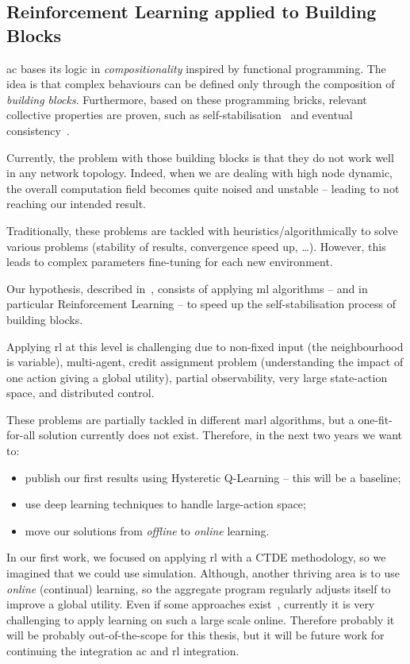 \documentclass[11pt]{article}
\begin{document}
\subsection{Reinforcement Learning applied to Building Blocks}\label{rl-future}
\ac{ac} bases its logic in \textit{compositionality} inspired by functional programming. The idea is that complex behaviours can be defined only through the composition of \emph{building blocks}. Furthermore, based on these programming bricks, relevant collective properties are proven, such as self-stabilisation~\cite{DBLP:journals/corr/abs-1711-08297} and eventual consistency~\cite{DBLP:conf/saso/BealVPD16}. 

Currently, the problem with those building blocks is that they do not work well in any network topology. Indeed, when we are dealing with high node dynamic, the overall computation field becomes quite noised and unstable -- leading to not reaching our intended result.

Traditionally, these problems are tackled with heuristics/algorithmically to solve various problems (stability of results, convergence speed up, \dots{}). However, this leads to complex parameters fine-tuning for each new environment.

Our hypothesis, described in~\cite{research}, consists of applying \ac{ml} algorithms -- and in particular Reinforcement Learning --
to speed up the self-stabilisation process of building blocks.

Applying \ac{rl} at this level is challenging due to non-fixed input (the neighbourhood is variable), multi-agent, credit assignment problem (understanding the impact of one action giving a global utility), partial observability, very large state-action space, and distributed control.

These problems are partially tackled in different \ac{marl} algorithms, but a one-fit-for-all solution currently does not exist. Therefore, in the next two years we want to:
\begin{itemize}
	\item publish our first results using Hysteretic Q-Learning -- this will be a baseline;
	\item use deep learning techniques to handle large-action space;
	\item move our solutions from \emph{offline} to \emph{online} learning. 
\end{itemize}
In our first work, we focused on applying \ac{rl} with a CTDE methodology, so we imagined that we could use simulation.
Although, another thriving area is to use \emph{online} (continual) learning, so the aggregate program regularly adjusts itself to improve a global utility. Even if some approaches exist~\cite{DBLP:conf/icml/OmidshafieiPAHV17}, currently it is very challenging to apply learning on such a large scale online. Therefore probably it will be probably out-of-the-scope for this thesis, but it will be future work for continuing the integration \ac{ac} and \ac{rl} integration. 
\end{document}
